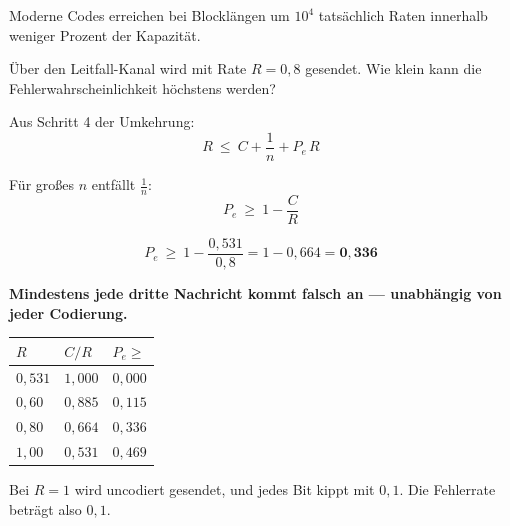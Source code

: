 \begin{aufgabe}
Moderne Codes erreichen bei Blocklängen um $10^{4}$ tatsächlich Raten innerhalb weniger Prozent der Kapazität.

\begin{center}
\begin{minipage}{0.86\textwidth}
\end{minipage}
\end{center}
\end{aufgabe}

\begin{aufgabe}
Über den Leitfall-Kanal wird mit Rate $R = 0{,}8$ gesendet. Wie klein kann die Fehlerwahrscheinlichkeit höchstens werden?

\loesung
{}
Aus Schritt 4 der Umkehrung:
\[ R \ \le\ C + \frac1n + P_e\,R \]

Für großes $n$ entfällt $\frac1n$:
\[ P_e \ \ge\ 1 - \frac{C}{R} \]

\[ P_e \ \ge\ 1 - \frac{0{,}531}{0{,}8} = 1 - 0{,}664 = \mathbf{0{,}336} \]

\begin{center}
\begin{minipage}{0.9\textwidth}
\textbf{Mindestens jede dritte Nachricht kommt falsch an --- unabhängig von jeder Codierung.}
\end{minipage}
\end{center}

\begin{center}
{\small
\renewcommand{\arraystretch}{1.48}
\begin{tabular}{@{}P{1.6cm}P{1.8cm}P{2.4cm}@{}}
\toprule
$R$ & $C/R$ & $P_e \ge$\\
\midrule
$0{,}531$ & $1{,}000$ & $0{,}000$\\
$0{,}60$ & $0{,}885$ & $0{,}115$\\
$0{,}80$ & $0{,}664$ & $0{,}336$\\
$1{,}00$ & $0{,}531$ & $0{,}469$\\
\bottomrule
\end{tabular}}
\end{center}

Bei $R = 1$ wird uncodiert gesendet, und jedes Bit kippt mit $0{,}1$. Die Fehlerrate  beträgt also $0{,}1$.


\end{aufgabe}
